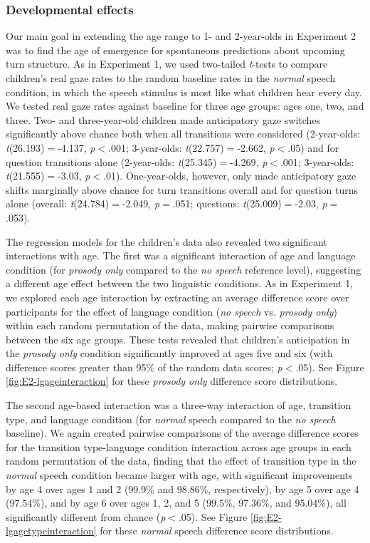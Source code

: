 \documentclass[authoryear, 12pt]{elsarticle}
\begin{document}
\subsubsection{Developmental effects}

Our main goal in extending the age range to 1- and 2-year-olds in Experiment 2 was to find the age of emergence for spontaneous predictions about upcoming turn structure. As in Experiment 1, we used two-tailed \textit{t}-tests to compare children's real gaze rates to the random baseline rates in the \textit{normal} speech condition, in which the speech stimulus is most like what children hear every day. We tested real gaze rates against baseline for three age groups: ages one, two, and three. Two- and three-year-old children made anticipatory gaze switches significantly above chance both when all transitions were considered (2-year-olds: \textit{t}(26.193)$=$-4.137, \textit{p}$<$.001; 3-year-olds: \textit{t}(22.757)$=$-2.662, \textit{p}$<$.05) and for question transitions alone (2-year-olds: \textit{t}(25.345)$=$-4.269, \textit{p}$<$.001; 3-year-olds: \textit{t}(21.555)$=$-3.03, \textit{p}$<$.01). One-year-olds, however, only made anticipatory gaze shifts marginally above chance for turn transitions overall and for question turns alone (overall: \textit{t}(24.784)$=$-2.049, \textit{p}$=$.051; questions: \textit{t}(25.009)$=$-2.03, \textit{p}$=$.053).

The regression models for the children's data also revealed two significant interactions with age. The first was a significant interaction of age and language condition (for \textit{prosody only} compared to the \textit{no speech} reference level), suggesting a different age effect between the two linguistic conditions. As in Experiment 1, we explored each age interaction by extracting an average difference score over participants for the effect of language condition (\textit{no speech} vs. \textit{prosody only}) within each random permutation of the data, making pairwise comparisons between the six age groups. These tests revealed that children's anticipation in the \textit{prosody only} condition significantly improved at ages five and six (with difference scores greater than 95\% of the random data scores; \textit{p}$<$.05). See Figure \ref{fig:E2-lgageinteraction} for these \textit{prosody only} difference score distributions.

The second age-based interaction was a three-way interaction of age, transition type, and language condition (for \textit{normal} speech compared to the \textit{no speech} baseline). We again created pairwise comparisons of the average difference scores for the transition type-language condition interaction across age groups in each random permutation of the data, finding that the effect of transition type in the \textit{normal} speech condition became larger with age, with significant improvements by age 4 over ages 1 and 2 (99.9\% and 98.86\%, respectively), by age 5 over age 4 (97.54\%), and by age 6 over ages 1, 2, and 5 (99.5\%, 97.36\%, and 95.04\%), all significantly different from chance (\textit{p}$<$.05). See Figure \ref{fig:E2-lgagetypeinteraction} for these \textit{normal} speech difference score distributions.
\end{document}
